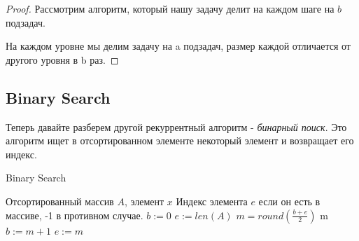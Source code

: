 \documentclass[../book.tex]{subfiles}
\begin{document}
	\begin{proof}
		Рассмотрим алгоритм, который нашу задачу делит на каждом шаге на $b$ подзадач.
		\begin{center}
		\end{center}
		На каждом уровне мы делим задачу на a подзадач, размер каждой отличается от другого уровня в b раз.  
		\begin{comment}
					на i уровне, n/b^i -- размер подзадачи
					всего на каждом уровне a^i подзадач.
					на каждом уровне a_i * (n/b^i)^d * c
					отсюда основная теорема.
		\end{comment}

	\end{proof}
	
	\subsection{Binary Search}
	
	Теперь давайте разберем другой рекуррентный алгоритм - \textit{бинарный поиск}. Это алгоритм ищет в отсортированном элементе некоторый элемент и возвращает его индекс.
		
	\begin{algorithm}[H]
		\caption{Binary Search}
		\begin{algorithmic}[1]
			\Require Отсортированный массив $A$, элемент $x$
			\Ensure Индекс элемента $e$ если он есть в массиве, -1 в противном случае.
				\State $b := 0$
				\State $e := len(A)$
					\State $m = round(\frac{b + e}{2})$
						\State \Return m
						\State $b := m + 1$
					\Else
						\State $e := m$
					\EndIf
				\EndWhile
				\State {}
			\EndFunction
		\end{algorithmic}
	\end{algorithm}
	
\end{document}
